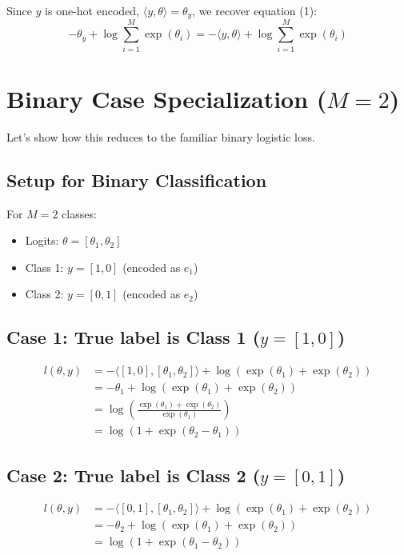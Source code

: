 \begin{notechapter}
Since $y$ is one-hot encoded, $\langle y, \theta\rangle = \theta_y$, we recover equation (1):
\[
-\theta_y + \log\sum_{i=1}^{M} \exp(\theta_i) = -\langle y, \theta\rangle + \log \sum_{i=1}^{M} \exp(\theta_i)
\]

\section{Binary Case Specialization ($M=2$)}

Let's show how this reduces to the familiar binary logistic loss.

\subsection{Setup for Binary Classification}
For $M=2$ classes:
\begin{itemize}
    \item Logits: $\theta = [\theta_1, \theta_2]$
    \item Class 1: $y = [1, 0]$ (encoded as $e_1$)
    \item Class 2: $y = [0, 1]$ (encoded as $e_2$)
\end{itemize}

\subsection{Case 1: True label is Class 1 ($y = [1, 0]$)}
\begin{align*}
l(\theta, y) &= -\langle [1, 0], [\theta_1, \theta_2] \rangle + \log(\exp(\theta_1) + \exp(\theta_2)) \\
&= -\theta_1 + \log(\exp(\theta_1) + \exp(\theta_2)) \\
&= \log\left(\frac{\exp(\theta_1) + \exp(\theta_2)}{\exp(\theta_1)}\right) \\
&= \log\left(1 + \exp(\theta_2 - \theta_1)\right)
\end{align*}

\subsection{Case 2: True label is Class 2 ($y = [0, 1]$)}
\begin{align*}
l(\theta, y) &= -\langle [0, 1], [\theta_1, \theta_2] \rangle + \log(\exp(\theta_1) + \exp(\theta_2)) \\
&= -\theta_2 + \log(\exp(\theta_1) + \exp(\theta_2)) \\
&= \log\left(1 + \exp(\theta_1 - \theta_2)\right)
\end{align*}


\end{notechapter}
